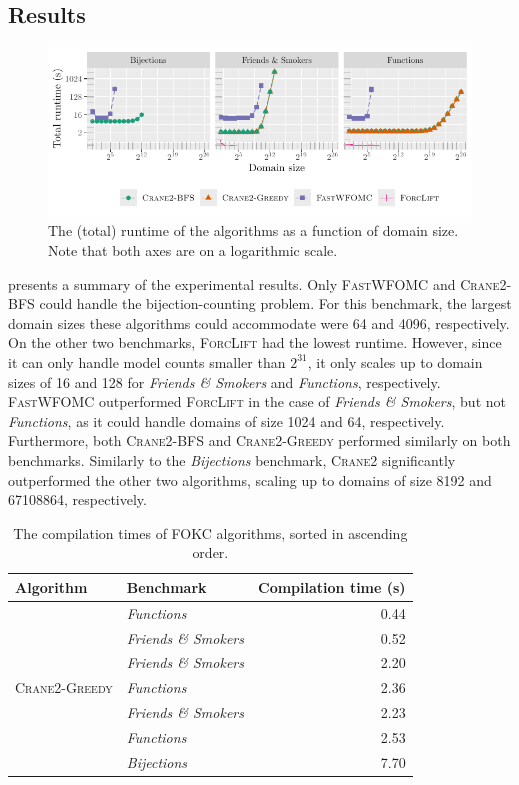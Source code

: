 \documentclass[a4paper,UKenglish,cleveref,autoref]{lipics-v2021}
\newcommand{\Cranetwo}{\textsc{Crane2}}
\newcommand{\Cranebfs}{\textsc{Crane2-BFS}}
\newcommand{\Cranegreedy}{\textsc{Crane2-Greedy}}
\newcommand{\friends}{\emph{Friends \& Smokers}}
\newcommand{\functions}{\emph{Functions}}
\newcommand{\bijections}{\emph{Bijections}}
\begin{document}
\subsection{Results}

\begin{figure}[t]
  \centering
  \includegraphics{plot.pdf}
  \caption{The (total) runtime of the algorithms as a function of domain size.
    Note that both axes are on a logarithmic scale.}\label{fig:plot}
\end{figure}

 presents a summary of the experimental results. Only
\textsc{FastWFOMC} and \Cranebfs{} could handle the bijection-counting problem.
For this benchmark, the largest domain sizes these algorithms could accommodate
were \num{64} and \num{4096}, respectively. On the other two benchmarks,
\textsc{ForcLift} had the lowest runtime. However, since it can only handle
model counts smaller than $2^{31}$, it only scales up to domain sizes of
\num{16} and \num{128} for \friends{} and \functions{}, respectively.
\textsc{FastWFOMC} outperformed \textsc{ForcLift} in the case of \friends{}, but
not \functions{}, as it could handle domains of size \num{1024} and \num{64},
respectively. Furthermore, both \Cranebfs{} and \Cranegreedy{} performed
similarly on both benchmarks. Similarly to the \bijections{} benchmark,
\Cranetwo{} significantly outperformed the other two algorithms, scaling up to
domains of size \num{8192} and \num{67108864}, respectively.

\begin{table}[t]
  \caption{The compilation times of FOKC algorithms, sorted in ascending
    order.}\label{tbl:compilation}
  \centering
  \begin{tabular}{llr}
    \toprule
    Algorithm & Benchmark & Compilation time (s)\\
    \midrule
    \rowcolor{gray!10}
              & \functions{} & 0.44\\
    \rowcolor{gray!10}
    \multirow{-2}{*}{\textsc{ForcLift}} & \friends{} & 0.52\\
              & \friends{} & 2.20\\
    \multirow{-2}{*}{\Cranegreedy{}} & \functions{} & 2.36\\
    \rowcolor{gray!10}
              & \friends{} & 2.23\\
    \rowcolor{gray!10}
              & \functions{} & 2.53\\
    \rowcolor{gray!10}
    \multirow{-3}{*}{\Cranebfs{}} & \bijections{} & 7.70\\
  \end{tabular}
\end{table}
\end{document}
